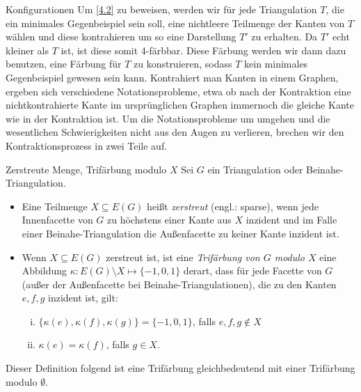 \begin{section}{Konfigurationen}
 Um \ref{4.2} zu beweisen, werden wir für jede Triangulation $T$, die ein minimales Gegenbeispiel sein soll, eine nichtleere Teilmenge der Kanten von $T$ wählen und diese kontrahieren um so eine Darstellung $T'$ zu erhalten. Da $T'$ echt kleiner als $T$ ist, ist diese somit 4-färbbar. Diese Färbung werden wir dann dazu benutzen, eine Färbung für $T$ zu konstruieren, sodass $T$ kein minimales Gegenbeispiel gewesen sein kann. Kontrahiert man Kanten in einem Graphen, ergeben sich verschiedene Notationsprobleme, etwa ob nach der Kontraktion eine nichtkontrahierte Kante im ursprünglichen Graphen immernoch die gleiche Kante wie in der Kontraktion ist. Um die Notationsprobleme um umgehen und die wesentlichen Schwierigkeiten nicht aus den Augen zu verlieren, brechen wir den Kontraktionsprozess in zwei Teile auf. 
 
 \begin{definition}{Zerstreute Menge, Trifärbung modulo $X$}
 Sei $G$ ein Triangulation oder Beinahe-Triangulation. 
 \begin{itemize}
  \item Eine Teilmenge $X \subseteq E(G)$ heißt \textit{zerstreut} (engl.: sparse), wenn jede Innenfacette von $G$ zu höchstens einer Kante aus $X$ inzident und im Falle einer Beinahe-Triangulation die Außenfacette zu keiner Kante inzident ist.
  \item Wenn $X \subseteq E(G)$ zerstreut ist, ist eine \textit{Trifärbung von $G$ modulo $X$} eine Abbildung $\kappa: E(G) \setminus X \mapsto \{-1,0,1\}$ derart, dass für jede Facette von $G$ (außer der Außenfacette bei Beinahe-Triangulationen), die zu den Kanten $e,f,g$ inzident ist, gilt:
  \begin{enumerate}[(i)]
   \item $\{\kappa(e),\kappa(f),\kappa(g)\} = \{-1,0,1\}$, falls $e,f,g \not\in X$
   \item $\kappa(e) = \kappa(f)$, falls $g\in X$.
  \end{enumerate}
 \end{itemize}
 \end{definition}
 
 Dieser Definition folgend ist eine Trifärbung gleichbedeutend mit einer Trifärbung modulo $\emptyset$. 
 

\end{section}
